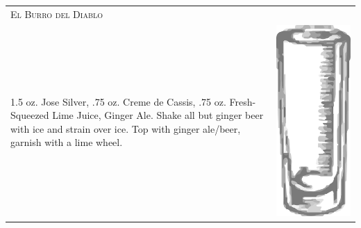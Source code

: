 \documentclass{article}
\begin{document}
\begin{multicols}{2}
\begin{tabular}{p{2in} p{0.5in}}
\multicolumn{2}{p{3in}}{\centering\Huge\textsc{El Burro del Diablo}} \\ 
  \vspace{-0.1in}1.5 oz. Jose Silver, .75 oz. Creme de Cassis, .75 oz. Fresh-Squeezed Lime Juice, Ginger Ale. Shake all but ginger beer with ice and strain over ice. Top with ginger ale/beer, garnish with a lime wheel. &
  \vspace{-0.1in} \includegraphics{collins.png}
\end{tabular}


\end{multicols}
\end{document}
